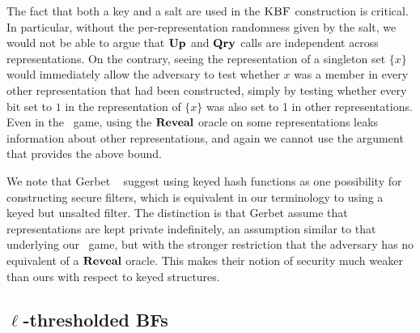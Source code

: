 
The fact that both a key and a salt are used in the $\textnormal{\textsc{KBF}}$ construction is
critical. In particular, without the per-representation randomness given by the
salt, we would not be able to argue that $\textup{\textbf{Up}}\hspace{0.5pt}$ and $\textup{\textbf{Qry}}\hspace{0.5pt}$ calls are
independent across representations. On the contrary, seeing the representation
of a singleton set $\{x\}$ would immediately allow the adversary to test whether
$x$ was a member in every other representation that had been constructed, simply
by testing whether every bit set to $1$ in the representation of $\{x\}$ was also
set to 1 in other representations. Even in the \erreps\ game, using the $\mathbf{Reveal}$
oracle on some representations leaks information about other representations,
and again we cannot use the argument that provides the above bound.

We note that Gerbet \etal~\cite{gerbet2015power} suggest using keyed
hash functions as one possibility for constructing secure filters, which is
equivalent in our terminology to using a keyed but unsalted filter.
%
The distinction is that Gerbet \etal assume that representations are kept
private indefinitely, an assumption similar to that underlying our \erreps\
game, but with the stronger restriction that the adversary has no equivalent of
a $\mathbf{Reveal}$ oracle. This makes their notion of security much weaker than ours with
respect to keyed structures.

\subsection{$\ell$-thresholded BFs}\label{sec:bf-thresh}

